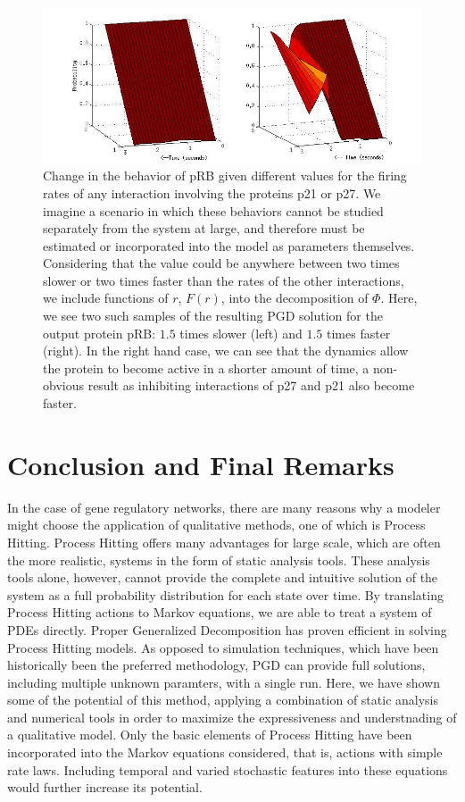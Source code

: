\documentclass{article}
\begin{document}
\begin{figure}[h!]
\centering
 \includegraphics[width=\textwidth]{pRBresults.jpg}

 \caption{Change in the behavior of pRB given different values for the firing rates of any interaction involving the proteins p21 or p27. We imagine a scenario in which these behaviors cannot be studied separately from the system at large, and therefore must be estimated or incorporated into the model as parameters themselves. Considering that the value could be anywhere between two times slower or two times faster than the rates of the other interactions, we include functions of $r$, $F(r)$, into the decomposition of $\Phi$. Here, we see two such samples of the resulting PGD solution for the output protein pRB: $1.5$ times slower (left) and $1.5$ times faster (right). In the right hand case, we can see that the dynamics allow the protein to become active in a shorter amount of time, a non-obvious result as inhibiting interactions of p27 and p21 also become faster.}
  \label{compare_par}

\end{figure} 


\section{Conclusion and Final Remarks}
In the case of gene regulatory networks, there are many reasons why a modeler might choose the application of qualitative methods, one of which is Process Hitting. Process Hitting offers many advantages for large scale, which are often the more realistic, systems in the form of static analysis tools. These analysis tools alone, however, cannot provide the complete and intuitive solution of the system as a full probability distribution for each state over time. By translating Process Hitting actions to Markov equations, we are able to treat a system of PDEs directly. Proper Generalized Decomposition has proven efficient in solving Process Hitting models. As opposed to simulation techniques, which have been historically been the preferred methodology, PGD can provide full solutions, including multiple unknown paramters, with a single run. Here, we have shown some of the potential of this method, applying a combination of static analysis and numerical tools in order to maximize the expressiveness and understnading of a qualitative model. Only the basic elements of Process Hitting have been incorporated into the Markov equations considered, that is, actions with simple rate laws. Including temporal and varied stochastic features into these equations would further increase its potential.


\end{document}
